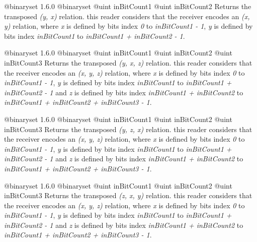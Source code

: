 {@binaryset}
{1.6.0}
{@binaryset}
{@uint inBitCount1}
{@uint inBitCount2}
{Returns the transposed \emph{(y, x)} relation.}
{this reader considers that the receiver encodes an \emph{(x, y)} relation, where \emph{x} is defined by bits index \emph{0} to \emph{inBitCount1  - 1}, \emph{y} is defined by bits index \emph{inBitCount1} to \emph{inBitCount1 + inBitCount2 - 1}.}







{@binaryset}
{1.6.0}
{@binaryset}
{@uint inBitCount1}
{@uint inBitCount2}
{@uint inBitCount3}
{Returns the transposed \emph{(y, x, z)} relation.}
{this reader considers that the receiver encodes an \emph{(x, y, z)} relation, where \emph{x} is defined by bits index \emph{0} to \emph{inBitCount1  - 1}, \emph{y} is defined by bits index \emph{inBitCount1} to \emph{inBitCount1 + inBitCount2 - 1} and  \emph{z} is defined by bits index \emph{inBitCount1 + inBitCount2} to \emph{inBitCount1 + inBitCount2 + inBitCount3 - 1}.}







{@binaryset}
{1.6.0}
{@binaryset}
{@uint inBitCount1}
{@uint inBitCount2}
{@uint inBitCount3}
{Returns the transposed \emph{(y, z, x)} relation.}
{this reader considers that the receiver encodes an \emph{(x, y, z)} relation, where \emph{x} is defined by bits index \emph{0} to \emph{inBitCount1  - 1}, \emph{y} is defined by bits index \emph{inBitCount1} to \emph{inBitCount1 + inBitCount2 - 1} and  \emph{z} is defined by bits index \emph{inBitCount1 + inBitCount2} to \emph{inBitCount1 + inBitCount2 + inBitCount3 - 1}.}







{@binaryset}
{1.6.0}
{@binaryset}
{@uint inBitCount1}
{@uint inBitCount2}
{@uint inBitCount3}
{Returns the transposed \emph{(z, x, y)} relation.}
{this reader considers that the receiver encodes an \emph{(x, y, z)} relation, where \emph{x} is defined by bits index \emph{0} to \emph{inBitCount1  - 1}, \emph{y} is defined by bits index \emph{inBitCount1} to \emph{inBitCount1 + inBitCount2 - 1} and  \emph{z} is defined by bits index \emph{inBitCount1 + inBitCount2} to \emph{inBitCount1 + inBitCount2 + inBitCount3 - 1}.}







